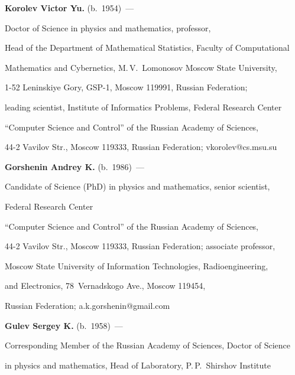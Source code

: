 \textbf{Korolev Victor Yu.} (b.\ 1954)~---


Doctor of Science in physics and mathematics, professor, 


Head of the Department of Mathematical Statistics, Faculty of Computational 


Mathematics and Cybernetics, M.\,V.~Lomonosov Moscow State University, 


1-52 Leninskiye Gory, GSP-1, Moscow 119991, Russian Federation; 


leading scientist, Institute of Informatics Problems, Federal Research Center 


``Computer Science and Control'' of the Russian Academy of Sciences, 


44-2 Vavilov Str., Moscow 119333, Russian Federation; vkorolev@cs.msu.su








\vspace*{3pt}





\noindent


\textbf{Gorshenin Andrey K.}  (b.\ 1986)~---


Candidate of Science (PhD) in physics and mathematics, senior scientist, 


Federal Research Center 


``Computer Science and Control'' of the Russian Academy of Sciences, 


44-2 Vavilov Str., Moscow 119333, Russian Federation; associate professor, 


Moscow State University of Information Technologies, Radioengineering,


and Electronics, 78~Vernadskogo Ave., Moscow 119454, 


Russian Federation;  a.k.gorshenin@gmail.com








\vspace*{3pt}





\noindent


\textbf{Gulev Sergey K.} (b.\ 1958)~---


Corresponding Member of the Russian Academy of Sciences, Doctor of Science 


in physics and mathematics, Head of Laboratory, P.\,P.~Shirshov Institute 



